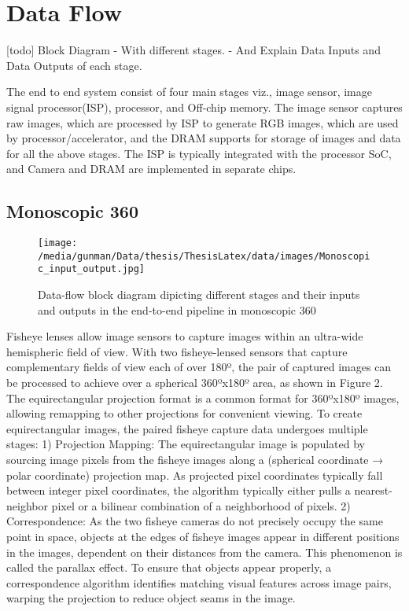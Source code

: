 \chapter{Data Flow}

[todo]
Block Diagram
- With different stages.
- And Explain Data Inputs and Data Outputs of each stage. 

The end to end system consist of four main stages viz., image sensor, image signal processor(ISP), processor, and Off-chip memory. The image sensor captures raw images, which are processed by ISP to generate RGB images, which are used by processor/accelerator, and the DRAM supports for storage of images and data for all the above stages. The ISP is typically integrated with the processor SoC, and Camera and DRAM are implemented in separate chips. 

\section{Monoscopic 360 }
\begin{figure}[h]
	\begin{center}
		\texttt{[image: /media/gunman/Data/thesis/ThesisLatex/data/images/Monoscopic\_input\_output.jpg]}
		\caption{Data-flow block diagram dipicting different stages and their inputs and outputs in the end-to-end pipeline in monoscopic 360}
		\label{Monoscopic_Input_Output}
	\end{center}
	\vspace{-0.3in}
\end{figure} 
Fisheye lenses allow image sensors to capture images within an ultra-wide hemispheric field of view. With two fisheye-lensed sensors that capture complementary fields of view each of over 180º, the pair of captured images can be processed to achieve over a spherical 360ºx180º area, as shown in Figure 2. The equirectangular projection format is a common format for 360ºx180º images, allowing remapping to other projections for convenient viewing. To create equirectangular images, the paired fisheye capture data undergoes multiple stages:
1) Projection Mapping: The equirectangular image is populated by sourcing image pixels from the fisheye images along a (spherical coordinate → polar coordinate) projection map. As projected pixel coordinates typically fall between integer pixel coordinates, the algorithm typically either pulls a nearest-neighbor pixel or a bilinear combination of a neighborhood of pixels. 
2) Correspondence:  As the two fisheye cameras do not precisely occupy the same point in space, objects at the edges of fisheye images appear in different positions in the images, dependent on their distances from the camera. This phenomenon is called the parallax effect. To ensure that objects appear properly, a correspondence algorithm identifies matching visual features across image pairs, warping the projection to reduce object seams in the image.
